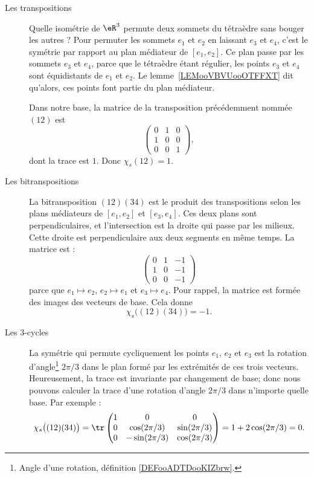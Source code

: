 \begin{description}
	\item[Les transpositions]

		Quelle isométrie de \( \eR^3\) permute deux sommets du tétraèdre sans bouger les autres ? Pour permuter les sommets \( e_1\) et \( e_2\) en laissant \( e_3\) et \( e_4\), c'est le symétrie par rapport au plan médiateur de \( [e_1,e_2]\). Ce plan passe par les sommets \( e_3\) et \( e_4\), parce que le tétraèdre étant régulier, les points \( e_3\) et \( e_4\) sont équidistants de \( e_1\) et \( e_2\). Le lemme~\ref{LEMooVBVUooOTFFXT} dit qu'alors, ces points font partie du plan médiateur.

		Dans notre base, la matrice de la transposition précédemment nommée \( (12)\) est
		\begin{equation}
			\begin{pmatrix}
				0 & 1 & 0 \\
				1 & 0 & 0 \\
				0 & 0 & 1
			\end{pmatrix},
		\end{equation}
		dont la trace est \( 1\). Donc \( \chi_s(12)=1\).

	\item[Les bitranspositions]

		La bitransposition \( (12)(34)\) est le produit des transpositions selon les plans médiateurs de \( [e_1,e_2]\) et \( [e_3,e_4]\). Ces deux plans sont perpendiculaires, et l'intersection est la droite qui passe par les milieux. Cette droite est perpendiculaire aux deux segments en même temps. La matrice est :
		\begin{equation}
			\begin{pmatrix}
				0 & 1 & -1 \\
				1 & 0 & -1 \\
				0 & 0 & -1
			\end{pmatrix}
		\end{equation}
		parce que \( e_1\mapsto e_2\), \( e_2\mapsto e_1\) et \( e_3\mapsto e_4\). Pour rappel, la matrice est formée des images des vecteurs de base. Cela donne
		\begin{equation}
			\chi_s\big( (12)(34) \big)=-1.
		\end{equation}

	\item[Les \( 3\)-cycles]
		La symétrie qui permute cycliquement les points \( e_1\), \( e_2\) et \( e_3\) est la rotation d'angle\footnote{Angle d'une rotation, définition \ref{DEFooADTDooKIZbrw}.} \( 2\pi/3\) dans le plan formé par les extrémités de ces trois vecteurs. Heureusement, la trace est invariante par changement de base; donc nous pouvons calculer la trace d'une rotation d'angle \( 2\pi/3\) dans n'importe quelle base. Par exemple :
		\begin{equation}
			\chi_s\big( (12)(34) \big)=\tr\begin{pmatrix}
				1 & 0             & 0            \\
				0 & \cos(2\pi/3)  & \sin(2\pi/3) \\
				0 & -\sin(2\pi/3) & \cos(2\pi/3)
			\end{pmatrix}=1+2\cos(2\pi/3)=0.
		\end{equation}


\end{description}
